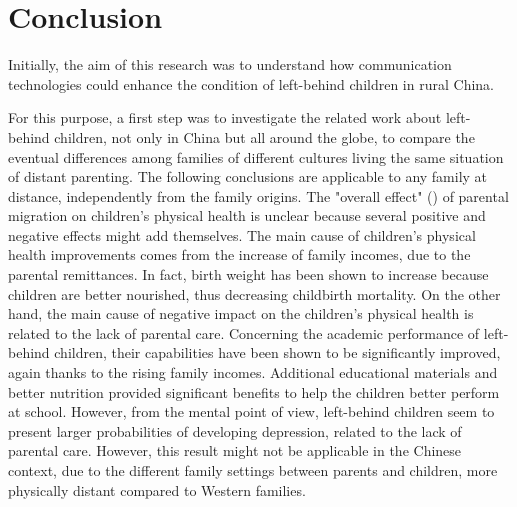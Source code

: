 \section{Conclusion}
\label{sec:conclusion}

Initially, the aim of this research was to understand how communication technologies could enhance the condition of left-behind children in rural China. 

For this purpose, a first step was to investigate the related work about left-behind children, not only in China but all around the globe, to compare the eventual differences among families of different cultures living the same situation of distant parenting. The following conclusions are applicable to any family at distance, independently from the family origins. The "overall effect" (\cite{guo2017effect}) of parental migration on children's physical health is unclear because several positive and negative effects might add themselves. The main cause of children's physical health improvements comes from the increase of family incomes, due to the parental remittances. In fact, birth weight has been shown to increase because children are better nourished, thus decreasing childbirth mortality. On the other hand, the main cause of negative impact on the children's physical health is related to the lack of parental care. Concerning the academic performance of left-behind children, their capabilities have been shown to be significantly improved, again thanks to the rising family incomes. Additional educational materials and better nutrition provided significant benefits to help the children better perform at school. However, from the mental point of view, left-behind children seem to present larger probabilities of developing depression, related to the lack of parental care. However, this result might not be applicable in the Chinese context, due to the different family settings between parents and children, more physically distant compared to Western families. 

